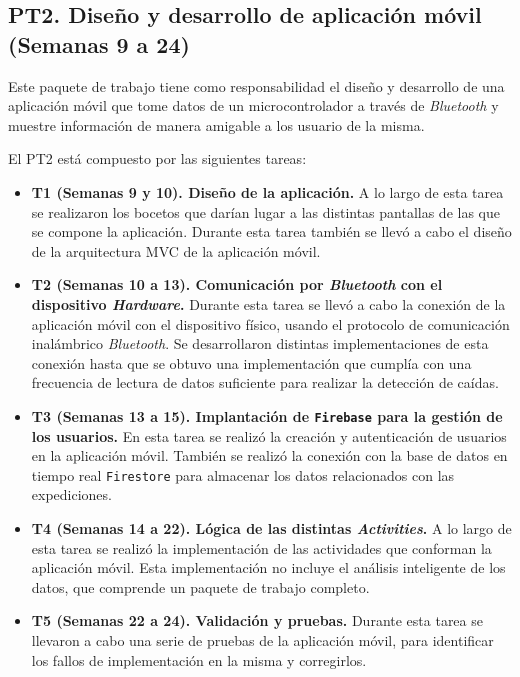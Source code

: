 \subsection{\ac{PT}2. Diseño y desarrollo de aplicación móvil (Semanas 9 a 24)}

Este paquete de trabajo tiene como responsabilidad el diseño y desarrollo de una aplicación móvil que tome datos de un microcontrolador a través de \textit{Bluetooth} y muestre información de manera amigable a los usuario de la misma.

El \ac{PT}2 está compuesto por las siguientes tareas:

\begin{itemize}
\item \textbf{\ac{T}1 (Semanas 9 y 10). Diseño de la aplicación.} A lo largo de esta tarea se realizaron los bocetos que darían lugar a las distintas pantallas de las que se compone la aplicación. Durante esta tarea también se llevó a cabo el diseño de la arquitectura \ac{MVC} de la aplicación móvil.
\item \textbf{\ac{T}2 (Semanas 10 a 13). Comunicación por \textit{Bluetooth} con el dispositivo \textit{Hardware}.} Durante esta tarea se llevó a cabo la conexión de la aplicación móvil con el dispositivo físico, usando el protocolo de comunicación inalámbrico \textit{Bluetooth}. Se desarrollaron distintas implementaciones de esta conexión hasta que se obtuvo una implementación que cumplía con una frecuencia de lectura de datos suficiente para realizar la detección de caídas.
\item \textbf{\ac{T}3 (Semanas 13 a 15). Implantación de \texttt{Firebase} para la gestión de los usuarios.} En esta tarea se realizó la creación y autenticación de usuarios en la aplicación móvil. También se realizó la conexión con la base de datos en tiempo real \texttt{Firestore} para almacenar los datos relacionados con las expediciones.
\item \textbf{\ac{T}4 (Semanas 14 a 22). Lógica de las distintas \textit{Activities}.} A lo largo de esta tarea se realizó la implementación de las actividades que conforman la aplicación móvil. Esta implementación no incluye el análisis inteligente de los datos, que comprende un paquete de trabajo completo.
\item \textbf{\ac{T}5 (Semanas 22 a 24). Validación y pruebas.} Durante esta tarea se llevaron a cabo una serie de pruebas de la aplicación móvil, para identificar los fallos de implementación en la misma y corregirlos.
\end{itemize}

